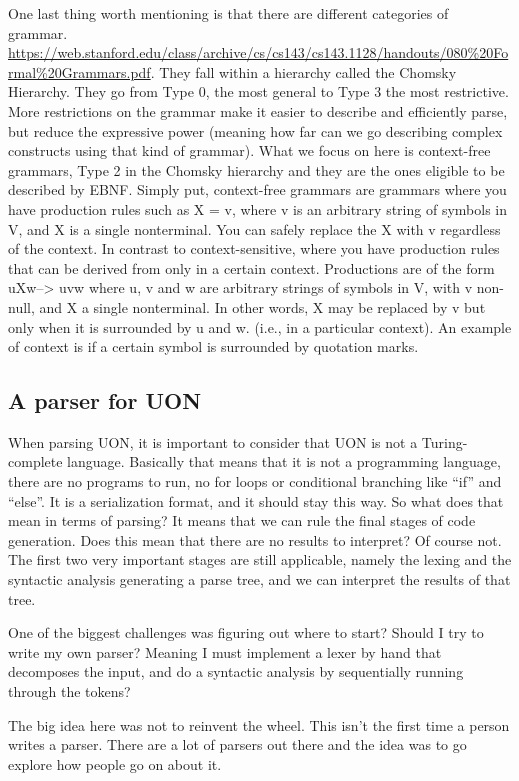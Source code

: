 \documentclass[12pt]{article}
\begin{document}
One last thing worth mentioning is that there are different categories of grammar. \url{https://web.stanford.edu/class/archive/cs/cs143/cs143.1128/handouts/080%20Formal%20Grammars.pdf}. They fall within a hierarchy called the Chomsky Hierarchy. They go from Type 0, the most general to Type 3 the most restrictive. More restrictions on the grammar make it easier to describe and efficiently parse, but reduce the expressive power (meaning how far can we go describing complex constructs using that kind of grammar).
What we focus on here is context-free grammars, Type 2 in the Chomsky hierarchy and they are the ones eligible to be described by EBNF. Simply put, context-free grammars are grammars where you have production rules such as X = v, where v is an arbitrary string of symbols in V, and X is a single nonterminal. You can safely replace the X with v regardless of the context. In contrast to context-sensitive, where you have production rules that can be derived from only in a certain context. Productions are of the form uXw–> uvw where u, v and w are arbitrary strings of symbols in V, with v non-null, and X a single nonterminal. In other words, X may be replaced by v but only when it is surrounded by u and w. (i.e., in a particular context). An example of context is if a certain symbol is surrounded by quotation marks. 

\pagebreak

\subsection{A parser for UON}
When parsing UON, it is important to consider that UON is not a Turing-complete language. Basically that means that it is not a programming language, there are no programs to run, no for loops or conditional branching like “if” and “else”. It is a serialization format, and it should stay this way. So what does that mean in terms of parsing? It means that we can rule the final stages of code generation. Does this mean that there are no results to interpret? Of course not. The first two very important stages are still applicable, namely the lexing and the syntactic analysis generating a parse tree, and we can interpret the results of that tree. 

One of the biggest challenges was figuring out where to start? Should I try to write my own parser? Meaning I must implement a lexer by hand that decomposes the input, and do a syntactic analysis by sequentially running through the tokens? 

The big idea here was not to reinvent the wheel. This isn’t the first time a person writes a parser. There are a lot of parsers out there and the idea was to go explore how people go on about it.
\end{document}

